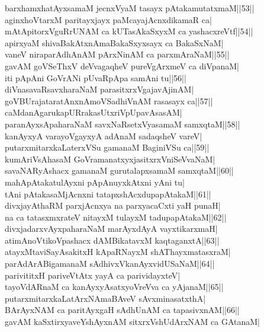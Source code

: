 \documentclass{article}
\begin{document}
barxhamxhatAyxsamaM jecnxVyaM tasayx pAtakamutatxmaM||53||\\
aginxhoVtarxM paritayxjayx paMcayajAcnxdikamaR ca|\\
mAtApitorxVguRrUNAM ca kUTasAkaSxyxM ca yashacxreVtf||54||\\
apirxyaM shivaBakAtxnAmaBakaSxyxsayx ca BakaSxNaM|\\
vaneV niraparAdhAnAM pArxNinAM ca parxmAraNaM||55||\\
gavAM goVSeThxV deVvagaqheV pureVgArxmeV ca diVpanaM|\\
iti pApAni GoVrANi pUvaRpApa samAni tu||56||\\
diVnasavaRsavxharaNaM parasitxrxVgajavAjinAM|\\
goVBUrajataratAnxnAmoVSadhiVnAM rasasayx ca||57||\\
caMdanAgarukapURrakasUtxriVpUpavAsasAM|\\
paranAyxsApaharaNaM savxNaRsetxVyasamaM samxqtaM||58||\\
kanAyxyA varayoVgayxyA adAnaM sadaqsheV vareV|\\
putarxmitarxkaLaterxVSu gamanaM BaginiVSu ca||59||\\
kumAriVsAhasaM GoVramanatxyxjasitxrxVniSeVvaNaM|\\
savaNARyAshacx gamanaM gurutalapxsamaM samxqtaM||60||\\
mahApAtakatulAyxni pApAnuyxkAtxni yAni tu|\\
tAni pAtakasaMjAcnxni tatapxshAcxdupapAtakaM||61||\\
divxjayAthaRM parxjAcnxya na parxyacaCxti yaH punaH|\\
na ca tatasxmxrateV nitayxM tulayxM tadupapAtakaM||62||\\
divxjadarxvAyxpaharaNaM marAyxdAyA vayxtikarxmaH|\\
atimAnoVtikoVpashacx dAMBikatavxM kaqtaganxtA||63||\\
atayxMtaviSayAsakitxH kApaRNayxM shAThayxmatasxraM|\\
parAdArABigamanaM sAdhivxVkanAyxvidUSaNaM||64||\\
parivititxH pariveVtAtx yayA ca parividayxteV|\\
tayoVdARnaM ca kanAyxyAsatxyoVreVva ca yAjanaM||65||\\
putarxmitarxkaLatArxNAmaBAveV sAvxminasatxthA|\\
BArAyxNAM ca paritAyxgaH sAdhUnAM ca tapasivxnAM||66||\\
gavAM kaSxtirxyaveYshAyxnAM sitxrxVshUdArxNAM ca GAtanaM|\\
\end{document}

